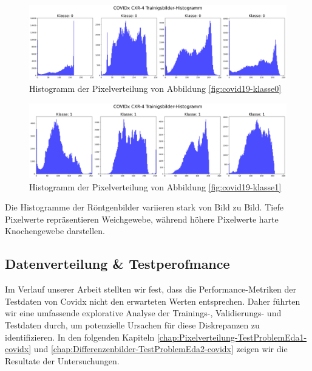 \begin{figure}[ht]
    \centering
    \includegraphics[width=\linewidth]{01-images/03-data/covid19-klasse0-hist.png}
    \caption{Histogramm der Pixelverteilung von Abbildung \ref{fig:covid19-klasse0}}
    \label{fig:covid19-klasse0-hist}
\end{figure}

\begin{figure}[ht]
    \centering
    \includegraphics[width=\linewidth]{01-images/03-data/covid19-klasse1-hist.png}
    \caption{Histogramm der Pixelverteilung von Abbildung \ref{fig:covid19-klasse1}}
    \label{fig:covid19-klasse1-hist}
\end{figure}

Die Histogramme der Röntgenbilder variieren stark von Bild zu Bild. Tiefe Pixelwerte repräsentieren Weichgewebe, während höhere Pixelwerte harte Knochengewebe darstellen. 

\subsection{Datenverteilung \& Testperofmance} \label{chap:Datenverteilung-Testperformance-covidx}

Im Verlauf unserer Arbeit stellten wir fest, dass die Performance-Metriken der Testdaten von Covidx nicht den erwarteten Werten entsprechen. Daher führten wir eine umfassende explorative Analyse der Trainings-, Validierungs- und Testdaten durch, um potenzielle Ursachen für diese Diskrepanzen zu identifizieren. In den folgenden Kapiteln \ref{chap:Pixelverteilung-TestProblemEda1-covidx} und \ref{chap:Differenzenbilder-TestProblemEda2-covidx} zeigen wir die Resultate der Untersuchungen.

